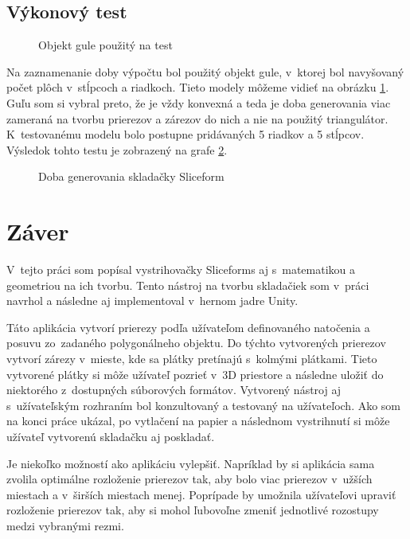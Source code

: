 \section{Výkonový test}
\begin{figure}[!h]
\centering
{}
\caption{Objekt gule použitý na test}
\label{fig:Gule}
\end{figure}
Na zaznamenanie doby výpočtu bol použitý objekt gule, v~ktorej bol navyšovaný počet plôch v~stĺpcoch a riadkoch. Tieto modely môžeme vidieť na obrázku \ref{fig:Gule}. Guľu som si vybral preto, že je vždy konvexná a teda je doba generovania viac zameraná na tvorbu prierezov a zárezov do nich a nie na použitý triangulátor. K~testovanému modelu bolo postupne pridávaných 5 riadkov a 5 stĺpcov. Výsledok tohto testu je zobrazený na grafe \ref{fig:grafCasGenerovania}. 
\begin{figure}[!h]
\centering
{}
\caption{Doba generovania skladačky Sliceform}
\label{fig:grafCasGenerovania}
\end{figure}

\chapter{Záver}

V~tejto práci som popísal vystrihovačky Sliceforms aj s~matematikou a geometriou na ich tvorbu.
Tento nástroj na tvorbu skladačiek som v~práci navrhol a následne aj implementoval v~hernom jadre Unity.

Táto aplikácia vytvorí prierezy podľa užívateľom definovaného natočenia a posuvu zo~zadaného polygonálneho objektu. Do týchto vytvorených prierezov vytvorí zárezy v~mieste, kde sa plátky pretínajú s~kolmými plátkami. Tieto vytvorené plátky si môže užívateľ pozrieť v~3D priestore a následne uložiť do niektorého z~dostupných súborových formátov. Vytvorený nástroj aj s~užívateľským rozhraním bol konzultovaný a testovaný na užívateľoch. Ako som na konci práce ukázal, po vytlačení na papier a následnom vystrihnutí si môže užívateľ vytvorenú skladačku aj poskladať. 


Je niekoľko možností ako aplikáciu vylepšiť. Napríklad by si aplikácia sama zvolila optimálne rozloženie prierezov tak, aby 
bolo 
viac prierezov v~užších miestach a v~širších miestach menej. Poprípade by umožnila užívateľovi upraviť rozloženie prierezov tak, aby si mohol ľubovoľne zmeniť jednotlivé rozostupy medzi vybranými rezmi.






